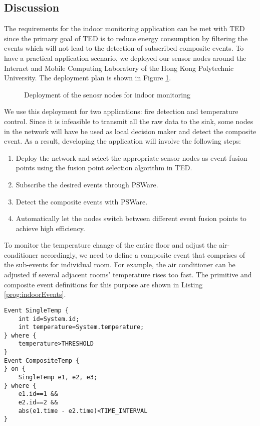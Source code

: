 \subsection{Discussion}
The requirements for the indoor monitoring application can be met with TED since the primary goal of TED is to reduce energy consumption by filtering the events which will not lead to the detection of subscribed composite events. To have a practical application scenario, we deployed our sensor nodes around the Internet and Mobile Computing Laboratory of the Hong Kong Polytechnic University. The deployment plan is shown in Figure \ref{fig:indoorDeployment}.

\begin{figure}
\centering
{}
\caption{Deployment of the senosr nodes for indoor monitoring}
\label{fig:indoorDeployment}
\end{figure}

We use this deployment for two applications: fire detection and temperature control. Since it is infeasible to transmit all the raw data to the sink, some nodes in the network will have be used as local decision maker and detect the composite event. As a result, developing the application will involve the following steps:
\begin{enumerate}
\item Deploy the network and select the appropriate sensor nodes as event fusion points using the fusion point selection algorithm in TED.
\item Subscribe the desired events through PSWare.
\item Detect the composite events with PSWare.
\item Automatically let the nodes switch between different event fusion points to achieve high efficiency.
\end{enumerate}

To monitor the temperature change of the entire floor and adjust the air-conditioner accordingly, we need to define a composite event that comprises of the sub-events for individual room. For example, the air conditioner can be adjusted if several adjacent rooms' temperature rises too fast. The primitive and composite event definitions for this purpose are shown in Listing \ref{prog:indoorEvents}.

\begin{lstlisting}[caption=Event definition for temperature monitoring, label=prog:indoorEvents]
Event SingleTemp {
	int id=System.id;
	int temperature=System.temperature;
} where {
	temperature>THRESHOLD
}
Event CompositeTemp {
} on {
	SingleTemp e1, e2, e3;
} where {
	e1.id==1 &&
	e2.id==2 &&
	abs(e1.time - e2.time)<TIME_INTERVAL
}
\end{lstlisting}

